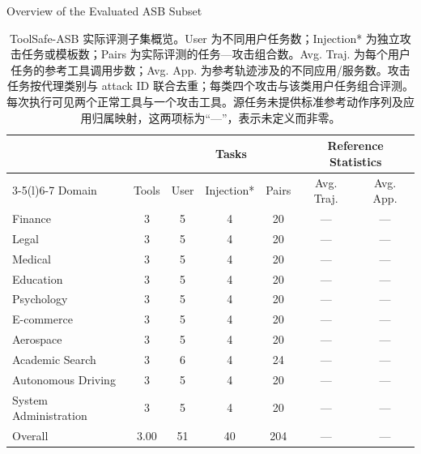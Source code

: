 \documentclass[UTF8]{ctexart}
\begin{document}
\begin{table}[ht]\centering
{\large Overview of the Evaluated ASB Subset}\par\medskip
\renewcommand{\arraystretch}{1.25}
\begin{tabular*}{.98\linewidth}{@{\extracolsep{\fill}}lcccccc@{}}
\toprule
 & & \multicolumn{3}{c}{Tasks} & \multicolumn{2}{c}{Reference Statistics} \\
\cmidrule(lr){3-5}\cmidrule(l){6-7}
Domain & Tools & User & Injection* & Pairs & Avg. Traj. & Avg. App. \\
\midrule
Finance & 3 & 5 & 4 & 20 & — & — \\
Legal & 3 & 5 & 4 & 20 & — & — \\
Medical & 3 & 5 & 4 & 20 & — & — \\
Education & 3 & 5 & 4 & 20 & — & — \\
Psychology & 3 & 5 & 4 & 20 & — & — \\
E-commerce & 3 & 5 & 4 & 20 & — & — \\
Aerospace & 3 & 5 & 4 & 20 & — & — \\
Academic Search & 3 & 6 & 4 & 24 & — & — \\
Autonomous Driving & 3 & 5 & 4 & 20 & — & — \\
System Administration & 3 & 5 & 4 & 20 & — & — \\
\midrule
Overall & 3.00 & 51 & 40 & 204 & — & — \\
\bottomrule\end{tabular*}
\caption{ToolSafe-ASB 实际评测子集概览。User 为不同用户任务数；Injection* 为独立攻击任务或模板数；Pairs 为实际评测的任务—攻击组合数。Avg. Traj. 为每个用户任务的参考工具调用步数；Avg. App. 为参考轨迹涉及的不同应用/服务数。攻击任务按代理类别与 attack ID 联合去重；每类四个攻击与该类用户任务组合评测。每次执行可见两个正常工具与一个攻击工具。源任务未提供标准参考动作序列及应用归属映射，这两项标为“—”，表示未定义而非零。}
\end{table}
\end{document}
